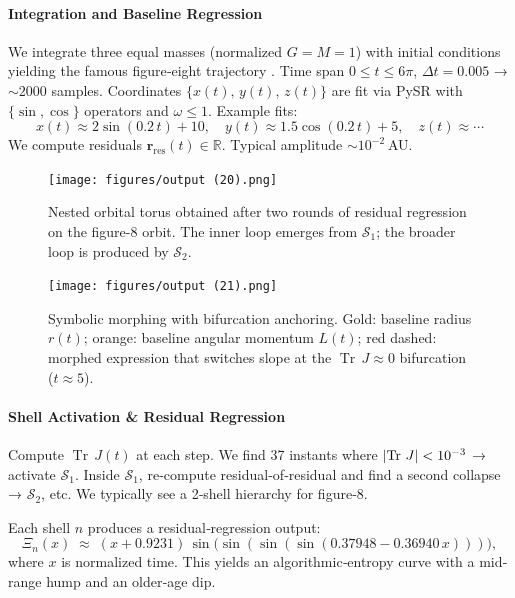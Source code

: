\documentclass[11pt]{article}
\newcommand{\Shell}{\mathcal{S}}
\newcommand{\Contradiction}{\Xi}
\newcommand{\TrJ}{\operatorname{Tr}\,J}
\let\CustomAbs\abs
\begin{document}
\paragraph{Integration and Baseline Regression}
We integrate three equal masses (normalized \(G=M=1\)) with initial conditions yielding the famous figure‐eight trajectory \cite{chenciner2000remarkable}. Time span \(0 \le t \le 6\pi\), \(\Delta t=0.005\) → \(\sim2000\) samples. Coordinates \(\{x(t),\,y(t),\,z(t)\}\) are fit via PySR with \(\{\sin,\cos\}\) operators and \(\omega \le 1\). Example fits:
\[
  x(t)\approx 2\sin(0.2\,t) + 10,\quad
  y(t)\approx 1.5\cos(0.2\,t) + 5,\quad
  z(t)\approx \cdots
\]
We compute residuals \(\bm r_{\mathrm{res}}(t)\in\mathbb R\). Typical amplitude \(\sim 10^{-2}\) AU.

\begin{figure}[H]
  \centering
  \texttt{[image: figures/output (20).png]}
  \caption{Nested orbital torus obtained after two rounds of residual regression on the figure-8 orbit. The inner loop emerges from \(\Shell_1\); the broader loop is produced by \(\Shell_2\).}
  \label{fig:nested_torus_morph}
\end{figure}

\begin{figure}[H]
  \centering
  \texttt{[image: figures/output (21).png]}
  \caption{Symbolic morphing with bifurcation anchoring. Gold: baseline radius \(r(t)\); orange: baseline angular momentum \(L(t)\); red dashed: morphed expression that switches slope at the \(\TrJ\!\approx\!0\) bifurcation (\(t\!\approx\!5\)).}
  \label{fig:symbolic_morphing_bifurcation}
\end{figure}

\paragraph{Shell Activation \& Residual Regression}
Compute \(\TrJ(t)\) at each step. We find 37 instants where \(\CustomAbs{\TrJ} < 10^{-3}\) → activate \(\Shell_1\). Inside \(\Shell_1\), re‐compute residual‐of‐residual and find a second collapse → \(\Shell_2\), etc. We typically see a 2‐shell hierarchy for figure‐8.

Each shell \(n\) produces a residual‐regression output:
\[
  \Contradiction_n(x) 
  \;\approx\; (x + 0.9231)\,\sin\bigl(\sin(\sin(\sin(0.37948 - 0.36940\,x)))\bigr),
\]
where \(x\) is normalized time. This yields an algorithmic‐entropy curve with a mid‐range hump and an older‐age dip.
\end{document}
